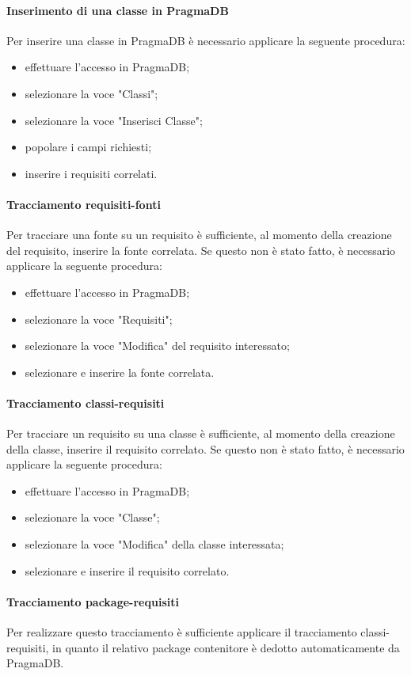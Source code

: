  \paragraph{Inserimento di una classe in PragmaDB}
 Per inserire una classe in PragmaDB è necessario applicare la seguente procedura:
 \begin{itemize}
 	\item effettuare l'accesso in PragmaDB;
 	\item selezionare la voce "Classi";
 	\item selezionare la voce "Inserisci Classe";
 	\item popolare i campi richiesti;
 	\item inserire i requisiti correlati.
 \end{itemize}
 \paragraph{Tracciamento requisiti-fonti}
 Per tracciare una fonte su un requisito è sufficiente, al momento della creazione del requisito, inserire la fonte correlata. Se questo non è stato fatto, è necessario applicare la seguente procedura:
 \begin{itemize}
 	\item effettuare l'accesso in PragmaDB;
 	\item selezionare la voce "Requisiti";
 	\item selezionare la voce "Modifica" del requisito interessato;
 	\item selezionare e inserire la fonte correlata.
 \end{itemize}
 \paragraph{Tracciamento classi-requisiti}
 Per tracciare un requisito su una classe è sufficiente, al momento della creazione della classe, inserire il requisito correlato. Se questo non è stato fatto, è necessario applicare la seguente procedura:
 \begin{itemize}
 	\item effettuare l'accesso in PragmaDB;
 	\item selezionare la voce "Classe";
 	\item selezionare la voce "Modifica" della classe interessata;
 	\item selezionare e inserire il requisito correlato.
 \end{itemize}
 \paragraph{Tracciamento package-requisiti}
 Per realizzare questo tracciamento è sufficiente applicare il tracciamento classi-requisiti, in quanto il relativo package contenitore è dedotto automaticamente da PragmaDB.
